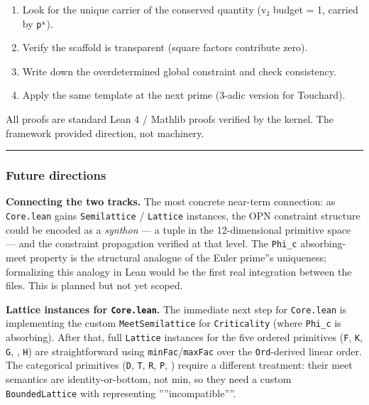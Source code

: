 \documentclass[11pt,a4paper]{article}
\begin{document}
\begin{enumerate}
    \item Look for the unique carrier of the conserved quantity (v₂ budget = 1, carried by \texttt{pᵏ}).
    \item Verify the scaffold is transparent (square factors contribute zero).
    \item Write down the overdetermined global constraint and check consistency.
    \item Apply the same template at the next prime (3-adic version for Touchard).
\end{enumerate}

All proofs are standard Lean 4 / Mathlib proofs verified by the kernel. The framework provided
direction, not machinery.

\begin{center}
\rule{0.5\textwidth}{0.4pt}
\end{center}

\subsubsection{Future directions}

\textbf{Connecting the two tracks.} The most concrete near-term connection: as \texttt{Core.lean} gains
\texttt{Semilattice} / \texttt{Lattice} instances, the OPN constraint structure could be encoded as a
\emph{synthon} --- a tuple in the 12-dimensional primitive space --- and the constraint propagation
verified at that level. The \texttt{Phi\_c} absorbing-meet property is the structural analogue of
the Euler prime''s uniqueness; formalizing this analogy in Lean would be the first real
integration between the files. This is planned but not yet scoped.

\textbf{Lattice instances for \texttt{Core.lean}.} The immediate next step for \texttt{Core.lean} is implementing
the custom \texttt{MeetSemilattice} for \texttt{Criticality} (where \texttt{Phi\_c} is absorbing). After that, full
\texttt{Lattice} instances for the five ordered primitives (\texttt{F}, \texttt{K}, \texttt{G}, \texttt{\Omega}, \texttt{H}) are
straightforward using \texttt{minFac}/\texttt{maxFac} over the \texttt{Ord}-derived linear order. The categorical
primitives (\texttt{D}, \texttt{T}, \texttt{R}, \texttt{P}, \texttt{\Gamma}) require a different treatment: their meet semantics are
identity-or-bottom, not min, so they need a custom \texttt{BoundedLattice} with \texttt{\perp} representing
''''incompatible''''.
\end{document}
